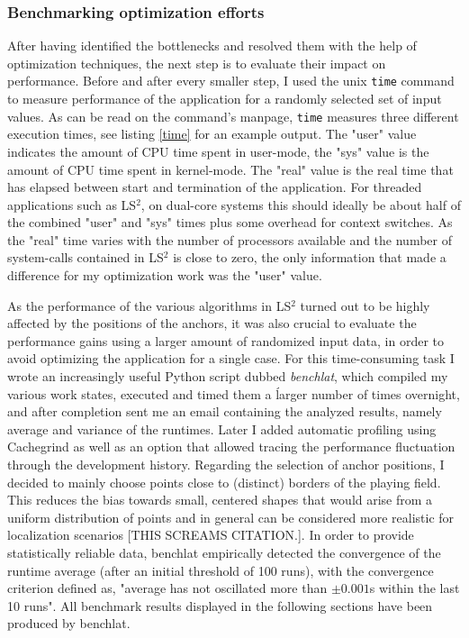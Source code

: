 \subsubsection{Benchmarking optimization efforts}
After having identified the bottlenecks and resolved them with the help of optimization techniques, the next step is to evaluate their impact on performance. Before and after every smaller step, I used the unix \texttt{time} command to measure performance of the application for a randomly selected set of input values. As can be read on the command's manpage, \texttt{time} measures three different execution times, see listing \ref{time} for an example output. The "user" value indicates the amount of CPU time spent in user-mode, the "sys" value is the amount of CPU time spent in kernel-mode. The "real" value is the real time that has elapsed between start and termination of the application. For threaded applications such as LS$^{2}$, on dual-core systems this should ideally be about half of the combined "user" and "sys" times plus some overhead for context switches. As the "real" time varies with the number of processors available and the number of system-calls contained in LS$^{2}$ is close to zero, the only information that made a difference for my optimization work was the "user" value.


As the performance of the various algorithms in LS$^{2}$ turned out to be highly affected by the positions of the anchors, it was also crucial to evaluate the performance gains using a larger amount of randomized input data, in order to avoid optimizing the application for a single case. For this time-consuming task I wrote an increasingly useful Python script dubbed \emph{benchlat}, which compiled my various work states, executed and timed them a ĺarger number of times overnight, and after completion sent me an email containing the analyzed results, namely average and variance of the runtimes. Later I added automatic profiling using Cachegrind as well as an option that allowed tracing the performance fluctuation through the development history. Regarding the selection of anchor positions, I decided to mainly choose points close to (distinct) borders of the playing field. This reduces the bias towards small, centered shapes that would arise from a uniform distribution of points and in general can be considered more realistic for localization scenarios [THIS SCREAMS CITATION.]. In order to provide statistically reliable data, benchlat empirically detected the convergence of the runtime average (after an initial threshold of 100 runs), with the convergence criterion defined as, "average has not oscillated more than $$s within the last 10 runs". All benchmark results displayed in the following sections have been produced by benchlat.

